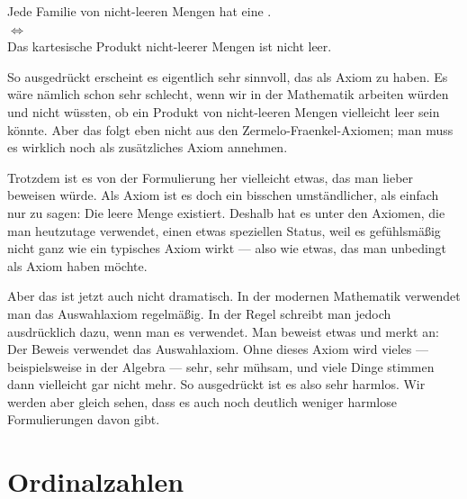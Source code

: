 \begin{math-stroke}
\begin{center}
Jede Familie von nicht-leeren Mengen hat eine . \\
$\iff$ \\
Das kartesische Produkt nicht-leerer Mengen ist nicht leer.
\end{center}
\end{math-stroke}

\begin{spoken-clean}[00:03:50 - 00:05:30]
So ausgedrückt erscheint es eigentlich sehr sinnvoll, das als Axiom zu haben. Es wäre nämlich schon sehr schlecht, wenn wir in der Mathematik arbeiten würden und nicht wüssten, ob ein Produkt von nicht-leeren Mengen vielleicht leer sein könnte. Aber das folgt eben nicht aus den Zermelo-Fraenkel-Axiomen; man muss es wirklich noch als zusätzliches Axiom annehmen.

Trotzdem ist es von der Formulierung her vielleicht etwas, das man lieber beweisen würde. Als Axiom ist es doch ein bisschen umständlicher, als einfach nur zu sagen: Die leere Menge existiert. Deshalb hat es unter den Axiomen, die man heutzutage verwendet, einen etwas speziellen Status, weil es gefühlsmäßig nicht ganz wie ein typisches Axiom wirkt --- also wie etwas, das man unbedingt als Axiom haben möchte.

Aber das ist jetzt auch nicht dramatisch. In der modernen Mathematik verwendet man das Auswahlaxiom regelmäßig. In der Regel schreibt man jedoch ausdrücklich dazu, wenn man es verwendet. Man beweist etwas und merkt an: Der Beweis verwendet das Auswahlaxiom. Ohne dieses Axiom wird vieles --- beispielsweise in der Algebra --- sehr, sehr mühsam, und viele Dinge stimmen dann vielleicht gar nicht mehr. So ausgedrückt ist es also sehr harmlos. Wir werden aber gleich sehen, dass es auch noch deutlich weniger harmlose Formulierungen davon gibt.
\end{spoken-clean}

\begin{ai-global-state-checkpoint-invisible-content}
\end{ai-global-state-checkpoint-invisible-content}

\section{Ordinalzahlen}


